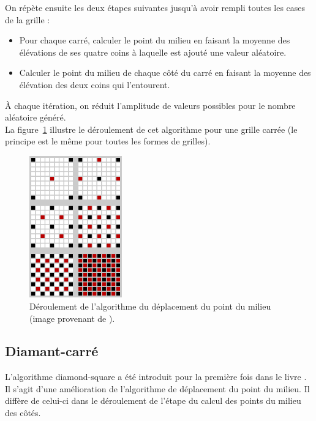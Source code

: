 On répète ensuite les deux étapes suivantes jusqu'à avoir rempli toutes les
cases de la grille :\\

\begin{itemize}
\item Pour chaque carré, calculer le point du milieu en faisant la moyenne
des élévations de ses quatre coins à laquelle est ajouté une valeur aléatoire.

\item Calculer le point du milieu de chaque côté du carré en faisant la moyenne
des élévation des deux coins qui l'entourent.\\
\end{itemize}

\`A chaque itération, on réduit l'amplitude de valeurs possibles pour
le nombre aléatoire généré.\\

La figure~\ref{fig:midpoint-displacement} illustre le déroulement de cet
algorithme pour une grille carrée (le principe est le même pour toutes les formes de grilles).

\begin{figure}[ht]
  \centering
  \includegraphics[width=4cm]{resources/midpoint-displacement.png}
  \caption{Déroulement de l'algorithme du déplacement du point du milieu (image
provenant de \cite{FractalTerrainGeneration}).}
  \label{fig:midpoint-displacement}
\end{figure}

\subsection{Diamant-carré}
L'algorithme diamond-square a été introduit pour la première fois dans le livre \cite{Four82}. Il s'agit d'une amélioration de l'algorithme de déplacement du point du
milieu. Il diffère de celui-ci dans le déroulement de l'étape du calcul des points
du milieu des côtés.\\

